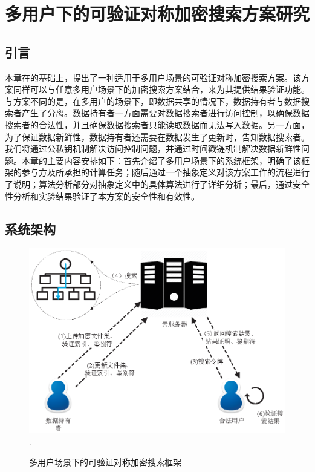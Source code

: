 \chapter{多用户下的可验证对称加密搜索方案研究}
\label{cha:multi-user}
\section{引言}
本章在\single 的基础上，提出了一种适用于多用户场景的可验证对称加密搜索方案\multi 。该方案同样可以与任意多用户场景下的加密搜索方案结合，来为其提供结果验证功能。与\single 方案不同的是，在多用户的场景下，即数据共享的情况下，数据持有者与数据搜索者产生了分离。数据持有者一方面需要对数据搜索者进行访问控制，以确保数据搜索者的合法性，并且确保数据搜索者只能读取数据而无法写入数据。另一方面，为了保证数据新鲜性，数据持有者还需要在数据发生了更新时，告知数据搜索者。我们将通过公私钥机制解决访问控制问题，并通过时间戳链机制解决数据新鲜性问题。本章的主要内容安排如下：首先介绍了多用户场景下的系统框架，明确了该框架的参与方及所承担的计算任务；随后通过一个抽象定义对该方案工作的流程进行了说明；算法分析部分对抽象定义中的具体算法进行了详细分析；最后，通过安全性分析和实验结果验证了本方案的安全性和有效性。



\section{系统架构}

\begin{figure}[t]
\centering
\includegraphics[width=5 in]{fig/GM-VSSE}
\DeclareGraphicsExtensions.
\caption{多用户场景下的可验证对称加密搜索框架\multi}
\label{fig:GM-VSSE}
\end{figure}

